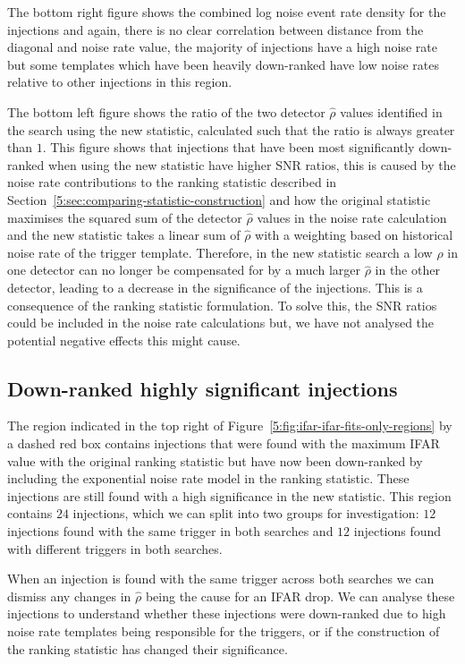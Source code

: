 The bottom right figure shows the combined log noise event rate density for the injections and again, there is no clear correlation between distance from the diagonal and noise rate value, the majority of injections have a high noise rate but some templates which have been heavily down-ranked have low noise rates relative to other injections in this region.

The bottom left figure shows the ratio of the two detector $\hat{\rho}$ values identified in the search using the new statistic, calculated such that the ratio is always greater than $1$. This figure shows that injections that have been most significantly down-ranked when using the new statistic have higher SNR ratios, this is caused by the noise rate contributions to the ranking statistic described in Section~\ref{5:sec:comparing-statistic-construction} and how the original statistic maximises the squared sum of the detector $\hat{\rho}$ values in the noise rate calculation and the new statistic takes a linear sum of $\hat{\rho}$ with a weighting based on historical noise rate of the trigger template. Therefore, in the new statistic search a low $\hat{\rho}$ in one detector can no longer be compensated for by a much larger $\hat{\rho}$ in the other detector, leading to a decrease in the significance of the injections. This is a consequence of the ranking statistic formulation. To solve this, the SNR ratios could be included in the noise rate calculations but, we have not analysed the potential negative effects this might cause.

\subsection{\label{5:sec:top-right-region}Down-ranked highly significant injections}

The region indicated in the top right of Figure~\ref{5:fig:ifar-ifar-fits-only-regions} by a dashed red box contains injections that were found with the maximum IFAR value with the original ranking statistic but have now been down-ranked by including the exponential noise rate model in the ranking statistic. These injections are still found with a high significance in the new statistic. This region contains $24$ injections, which we can split into two groups for investigation: $12$ injections found with the same trigger in both searches and $12$ injections found with different triggers in both searches. 

When an injection is found with the same trigger across both searches we can dismiss any changes in $\hat{\rho}$ being the cause for an IFAR drop. We can analyse these injections to understand whether these injections were down-ranked due to high noise rate templates being responsible for the triggers, or if the construction of the ranking statistic has changed their significance.

